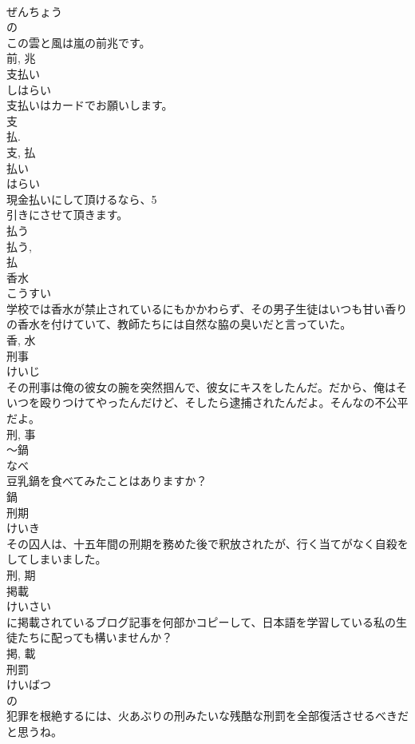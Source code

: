 \documentclass[8pt]{extreport}
\begin{document}
\begin{CJK}{UTF8}{min}
\\	ぜんちょう	
\\	の 
\\	この雲と風は嵐の前兆です。	
\\	前, 兆	
\\	支払い	
\\	しはらい	
\\	支払いはカードでお願いします。	
\\	支 
\\	払. 
\\	支, 払	
\\	払い	
\\	はらい	
\\	現金払いにして頂けるなら、5
\\	引きにさせて頂きます。	
\\	払う 
\\	払う, 
\\	払	
\\	香水	
\\	こうすい	
\\	学校では香水が禁止されているにもかかわらず、その男子生徒はいつも甘い香りの香水を付けていて、教師たちには自然な脇の臭いだと言っていた。	
\\	香, 水	
\\	刑事	
\\	けいじ	
\\	その刑事は俺の彼女の腕を突然掴んで、彼女にキスをしたんだ。だから、俺はそいつを殴りつけてやったんだけど、そしたら逮捕されたんだよ。そんなの不公平だよ。	
\\	刑, 事	
\\	〜鍋	
\\	なべ	
\\	豆乳鍋を食べてみたことはありますか？	
\\	鍋	
\\	刑期	
\\	けいき	
\\	その囚人は、十五年間の刑期を務めた後で釈放されたが、行く当てがなく自殺をしてしまいました。	
\\	刑, 期	
\\	掲載	
\\	けいさい	
\\	に掲載されているブログ記事を何部かコピーして、日本語を学習している私の生徒たちに配っても構いませんか？	
\\	掲, 載	
\\	刑罰	
\\	けいばつ	
\\	の 
\\	犯罪を根絶するには、火あぶりの刑みたいな残酷な刑罰を全部復活させるべきだと思うね。	

\end{CJK}
\end{document}
